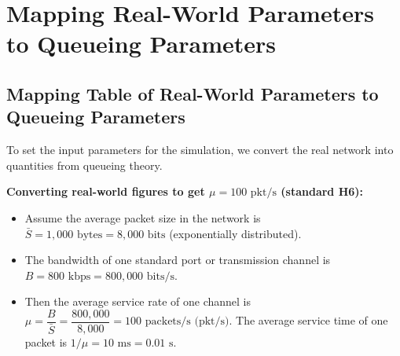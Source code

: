 \section{Mapping Real-World Parameters to Queueing Parameters}
\subsection{Mapping Table of Real-World Parameters to Queueing Parameters}
\noindent To set the input parameters for the simulation, we convert the real network into quantities from queueing theory.

\textbf{Converting real-world figures to get $\mu = 100\text{ pkt/s}$ (standard H6):}
\begin{itemize}
  \item Assume the average packet size in the network is
        $\bar{S} = 1{,}000\text{ bytes} = 8{,}000\text{ bits}$
        (exponentially distributed).
  \item The bandwidth of one standard port or transmission channel is
        $B = 800\text{ kbps} = 800{,}000\text{ bits/s}$.
  \item Then the average service rate of one channel is
        $\mu = \dfrac{B}{\bar{S}} = \dfrac{800{,}000}{8{,}000} = 100\text{ packets/s (pkt/s)}$.
        The average service time of one packet is
        $1/\mu = 10\text{ ms} = 0.01\text{ s}$.
\end{itemize}

